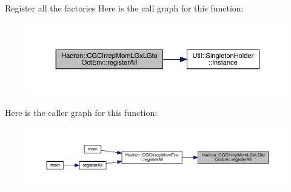 Register all the factories Here is the call graph for this function\+:\nopagebreak
\begin{figure}[H]
\begin{center}
\leavevmode
\includegraphics[width=350pt]{da/d36/namespaceHadron_1_1CGCIrrepMomLGxLGtoOctEnv_af4080789e3dc09dd752e71cb20ff3cb7_cgraph}
\end{center}
\end{figure}
Here is the caller graph for this function\+:\nopagebreak
\begin{figure}[H]
\begin{center}
\leavevmode
\includegraphics[width=350pt]{da/d36/namespaceHadron_1_1CGCIrrepMomLGxLGtoOctEnv_af4080789e3dc09dd752e71cb20ff3cb7_icgraph}
\end{center}
\end{figure}
